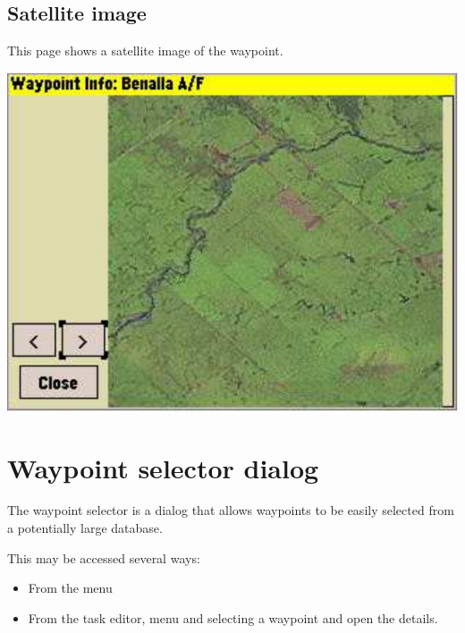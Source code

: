 \documentclass[a4paper,12pt]{refrep}
\begin{document}
\subsection*{Satellite image}
This page shows a satellite image of the
waypoint.

\begin{center}
\includegraphics[angle=0,width=\linewidth,keepaspectratio='true']{figures/dialog-waypointdetails2.pdf}
\end{center}


\section{Waypoint selector dialog}
The waypoint selector is a dialog that allows waypoints to be easily selected
from a potentially large database.

This may be accessed several ways:
\begin{itemize}
\item From the menu \blink{}
\item From the task editor, menu \blink{}\blink{} and selecting a waypoint and open the details.
\end{itemize}
\end{document}
